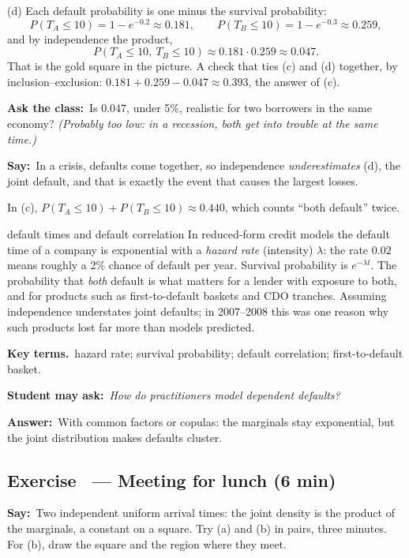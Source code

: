\documentclass[11pt,a4paper,parskip=half]{scrartcl}
\renewcommand{\needspace}[1]{\Needspace{6\baselineskip}}
\newcommand{\terms}{\par\textbf{\color{plum}Key terms.}\ }
\newcommand{\sq}[1]{\par\textbf{\color{plum}Student may ask:}\ \emph{#1}\par}
\newcommand{\ans}{\textbf{Answer:}\ }
\newcommand{\say}{\textbf{\color{teal}Say:}\ }
\newcommand{\ask}{\textbf{\color{navy}Ask the class:}\ }
\begin{document}
(d) Each default probability is one minus the survival probability:
\[ P(T_A\le10)=1-e^{-0.2}\approx0.181,\qquad P(T_B\le10)=1-e^{-0.3}\approx0.259, \]
and by independence the product,
\[ P(T_A\le10,\ T_B\le10)\approx0.181\cdot0.259\approx0.047. \]
That is the gold square in the picture. A check that ties (c) and (d)
together, by inclusion--exclusion:
$0.181+0.259-0.047\approx0.393$, the answer of (c).

\ask Is $0.047$, under 5\%, realistic for two borrowers in the same
economy? \emph{(Probably too low: in a recession, both get into trouble at
the same time.)}

\say In a crisis, defaults come together, so independence
\emph{underestimates} (d), the joint default, and that is exactly the
event that causes the largest losses.

\begin{mistake}
	In (c), $P(T_A\le10)+P(T_B\le10)\approx0.440$, which counts ``both
	default'' twice.
\end{mistake}

\begin{bg}{default times and default correlation}
	In reduced-form credit models the default time of a company is
	exponential with a \emph{hazard rate} (intensity) $\lambda$: the rate
	$0.02$ means roughly a 2\% chance of default per year. Survival
	probability is $e^{-\lambda t}$. The probability that \emph{both}
	default is what matters for a lender with exposure to both, and for
	products such as first-to-default baskets and CDO tranches. Assuming
	independence understates joint defaults; in 2007--2008 this was one
	reason why such products lost far more than models predicted.

	\terms hazard rate; survival probability; default correlation;
	first-to-default basket.

	\sq{How do practitioners model dependent defaults?}
	\ans With common factors or copulas: the marginals stay exponential, but
	the joint distribution makes defaults cluster.
\end{bg}

\needspace{0.25\textheight}
\subsection{Exercise~ --- Meeting for lunch (6 min)}


\say Two independent uniform arrival times: the joint density is the
product of the marginals, a constant on a square. Try (a) and (b) in
pairs, three minutes. For (b), draw the square and the region where they
meet.
\end{document}

